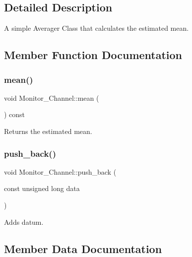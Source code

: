 \subsection{Detailed Description}
A simple Averager Class that calculates the estimated mean. 

\subsection{Member Function Documentation}
\mbox{\label{classMonitor__Channel_af36bc5cdbc25444ae5941241d0edb6b0}} 
\subsubsection{\texorpdfstring{mean()}{mean()}}
{\footnotesize\ttfamily void Monitor\+\_\+\+Channel\+::mean (\begin{DoxyParamCaption}{ }\end{DoxyParamCaption}) const\hspace{0.3cm}{\ttfamily [inline]}}



Returns the estimated mean. 

\mbox{\label{classMonitor__Channel_a4ed59419438e461cca7b211337840b0f}} 
\subsubsection{\texorpdfstring{push\+\_\+back()}{push\_back()}}
{\footnotesize\ttfamily void Monitor\+\_\+\+Channel\+::push\+\_\+back (\begin{DoxyParamCaption}\item[{const unsigned long}]{data }\end{DoxyParamCaption})\hspace{0.3cm}{\ttfamily [inline]}}



Adds datum. 



\subsection{Member Data Documentation}
\mbox{\label{classMonitor__Channel_a20d148ca870b96cb19b7befbb0b2cd2b}} 
